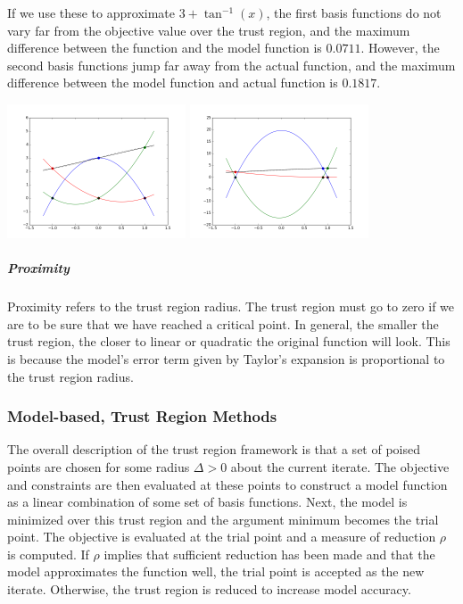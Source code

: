 \documentclass{article}
\begin{document}
If we use these to approximate $3 + \tan^{-1}(x)$, the first basis functions do not vary far from the objective value over the trust region, and the maximum difference between the function and the model function is $0.0711$.
However, the second basis functions jump far away from the actual function, and the maximum difference between the model function and actual function is 
$0.1817$.

\includegraphics[width=200px]{poised_approx.png}
\includegraphics[width=200px]{illpoised_approx.png}


\subparagraph{Proximity}

Proximity refers to the trust region radius.
The trust region must go to zero if we are to be sure that we have reached a critical point.
In general, the smaller the trust region, the closer to linear or quadratic the original function will look.
This is because the model's error term given by Taylor's expansion is proportional to the trust region radius.


\subsubsection{Model-based, Trust Region Methods}

The overall description of the trust region framework is that a set of poised points are chosen for some radius $\Delta>0$ about the current iterate.
The objective and constraints are then evaluated at these points to construct a model function as a linear combination of some set of basis functions.
Next, the model is minimized over this trust region and the argument minimum becomes the trial point.
The objective is evaluated at the trial point and a measure of reduction $\rho$ is computed.
If $\rho$ implies that sufficient reduction has been made and that the model approximates the function well, the trial point is accepted as the new iterate.
Otherwise, the trust region is reduced to increase model accuracy.
\end{document}
